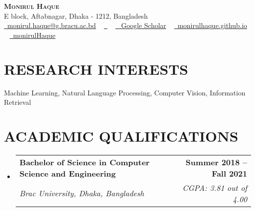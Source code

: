 \documentclass[letterpaper,10.5pt]{article}
\makeatletter
\newcommand{\resumeSubheading}[4]{
  \vspace{-2pt}\item
    \begin{tabular*}{1.0\textwidth}[t]{l@{\extracolsep{\fill}}r}
      \textbf{#1} & \textbf{\small #2} \\
      \textit{\small#3} & \textit{\small #4} \\
    \end{tabular*}\vspace{-7pt}
}
\newcommand{\resumeSubHeadingListStart}{\begin{itemize}[leftmargin=0.0in, label={}]}
\newcommand{\resumeSubHeadingListEnd}{\end{itemize}}
\makeatother
\begin{document}

\begin{center}
  {\textbf{\Huge \scshape Monirul Haque}}  \\ \vspace{0.08in}
  E block, Aftabnagar, Dhaka - 1212, Bangladesh \\ \vspace{1pt}
  \href{mailto:monirul.haque@g.Bracu.ac.bd}{\raisebox{-0.05\height}\faEnvelope\  \color{NavyBlue}monirul.haque@g.bracu.ac.bd} ~
  \href{https://www.linkedin.com/in/monirulhaq/}{\raisebox{-0.05\height} \faLinkedin\ \color{NavyBlue}{monirulhaq}}  ~
  \href{https://scholar.google.com/citations?user=PfjUg1UAAAAJ&hl=en&oi=sra}{\raisebox{-0.05\height}\faGraduationCap\  \color{NavyBlue} Google Scholar} ~
  \href{https://monirulhaque.github.io/}{\raisebox{-0.05\height}\faHome\ \color{NavyBlue}monirulhaque.github.io}  ~
  \href{https://github.com/monirulHaque}{\raisebox{-0.05\height}\faGithub\ \color{NavyBlue}monirulHaque}  ~


  \vspace{-6pt}
\end{center}

\section{RESEARCH INTERESTS}
Machine Learning, Natural Language Processing, Computer Vision, Information Retrieval

\vspace{-6pt}

\section{ACADEMIC QUALIFICATIONS}
\resumeSubHeadingListStart
\resumeSubheading
{Bachelor of Science in Computer Science and Engineering}{Summer 2018 -- Fall 2021}
{Brac University, Dhaka, Bangladesh}{CGPA: 3.81 out of 4.00}
\resumeSubHeadingListEnd
\end{document}

